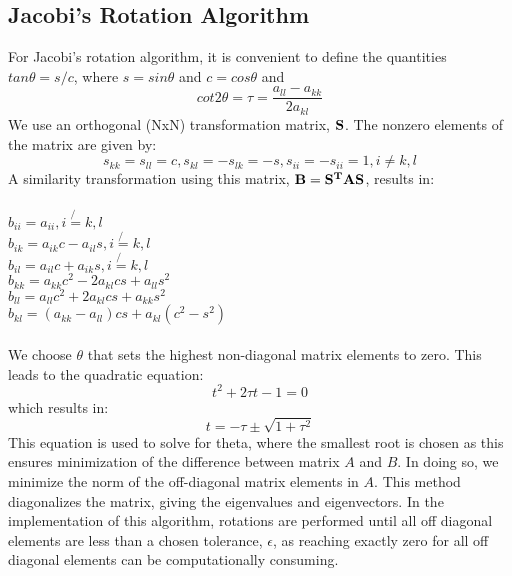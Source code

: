 \documentclass[10pt,showpacs,preprintnumbers,amsmath,amssymb,aps,prl,twocolumn,groupedaddress,superscriptaddress,showkeys]{revtex4-1}
\begin{document}
\subsection{Jacobi's Rotation Algorithm}
For Jacobi's rotation algorithm, it is convenient to define the quantities $tan\theta = s/c$, where $s = sin\theta$ and $c = cos\theta$ and 
\begin{equation}
cot 2 \theta = \tau = \frac{a_{ll} - a_{kk}}{2a_{kl}}
\end{equation}
We use an orthogonal (NxN) transformation matrix, $\bf{S}$. The nonzero elements of the matrix are given by:
\begin{equation}
s_{kk} = s_{ll} = c, s_{kl} = -s_{lk} = -s, s_{ii} = -s_{ii}=1, i \ne k,l
\end{equation}
A similarity transformation using this matrix, $\bf{B} = \bf{S^T}\bf{A}\bf{S}$, results in: \\
\\
$b_{ii}=a_{ii}, i\not{=}k, l$\\
	$b_{ik}=a_{ik}c-a_{il}s, i\not{=}k, l$\\
	$b_{il}=a_{il}c+a_{ik}s, i\not{=}k, l$\\
	$b_{kk}=a_{kk}c^{2}-2a_{kl}cs+a_{ll}s^{2}$\\
	$b_{ll}=a_{ll}c^{2}+2a_{kl}cs+a_{kk}s^{2}$\\
	$b_{kl}=(a_{kk}-a_{ll})cs+a_{kl}(c^{2}-s^{2})$ \\
	\\
We choose $\theta$ that sets the highest non-diagonal matrix elements to zero. This leads to the quadratic equation:
\begin{equation}
t^2+2\tau t -1=0
\end{equation}
which results in:
\begin{equation}
t = -\tau \pm \sqrt{1+\tau^2}
\end{equation}
This equation is used to solve for theta, where the smallest root is chosen as this ensures minimization of the difference between matrix $A$ and $B$. In doing so, we minimize the norm of the off-diagonal matrix elements in $A$. This method diagonalizes the matrix, giving the eigenvalues and eigenvectors. In the implementation of this algorithm, rotations are performed until all off diagonal elements are less than a chosen tolerance, $\epsilon$, as reaching exactly zero for all off diagonal elements can be computationally consuming. 
\end{document}
